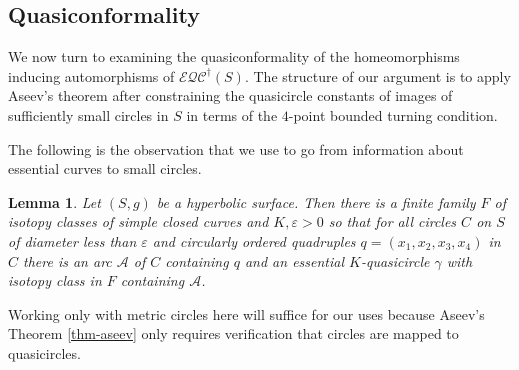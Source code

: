 \documentclass[12pt,a4paper]{amsart}
\theoremstyle{definition}
\theoremstyle{plain}
\newtheorem{lemma}[theorem]{Lemma}
\numberwithin{equation}{section}
\newcommand{\eqcg}{\mathcal{E\!QC}^{\dagger}}
\begin{document}
\subsection{Quasiconformality}\label{ss-quasiconformality}
We now turn to examining the quasiconformality of the homeomorphisms inducing automorphisms of $\eqcg(S)$.
The structure of our argument is to apply Aseev's theorem after constraining the quasicircle constants of images of sufficiently small circles in $S$ in terms of the $4$-point bounded turning condition.

The following is the observation that we use to go from information about essential curves to small circles.

\begin{lemma}\label{lemma-stick-arc-in-QC}
    Let $(S,g)$ be a hyperbolic surface.
    Then there is a finite family $F$ of isotopy classes of simple closed curves and $K, \varepsilon > 0$ so that for all circles $C$ on $S$ of diameter less than $\varepsilon$ and circularly ordered quadruples $q = (x_1, x_2, x_3,x_4) $ in $C$ there is an arc $\mathcal{A}$ of $C$ containing $q$ and an essential $K$-quasicircle $\gamma$ with isotopy class in $F$ containing $\mathcal{A}$.
\end{lemma}

Working only with metric circles here will suffice for our uses because Aseev's Theorem \ref{thm-aseev} only requires verification that circles are mapped to quasicircles.
\end{document}
